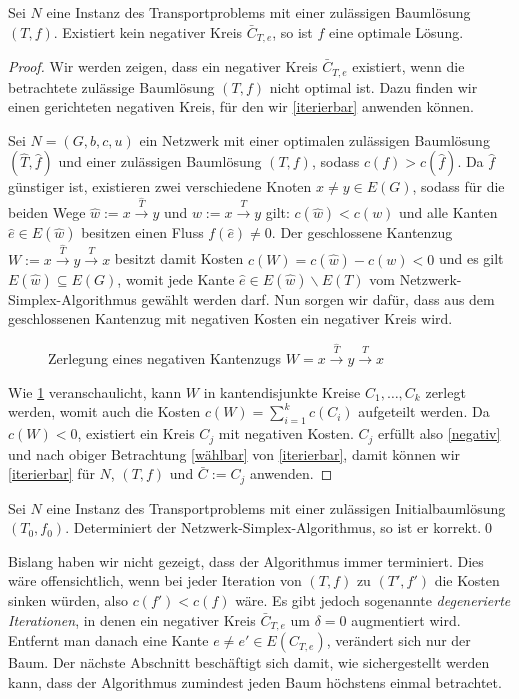 \begin{thm}\label{opt}Sei $N$ eine Instanz des Transportproblems mit einer zulässigen Baumlösung $(T,f)$. Existiert kein negativer Kreis $\bar{C}_{T,e}$, so ist $f$ eine optimale Lösung.\end{thm}
\begin{proof}Wir werden zeigen, dass ein negativer Kreis $\bar{C}_{T,e}$ existiert, wenn die betrachtete zulässige Baumlösung $(T,f)$ nicht optimal ist. Dazu finden wir einen gerichteten negativen Kreis, für den wir \cref{iterierbar} anwenden können.
	
Sei $N=(G,b,c,u)$ ein Netzwerk mit einer optimalen zulässigen Baumlösung $(\hat{T},\hat{f})$ und einer zulässigen Baumlösung $(T,f)$, sodass $c(f)>c(\hat{f})$. Da $\hat{f}$ günstiger ist, existieren zwei verschiedene Knoten $x\neq y\in E(G)$, sodass für die beiden Wege $\hat{w}:=x\xrightarrow{\hat{T}}y$ und $w:=x\xrightarrow{T}y$ gilt: $c(\hat{w})<c(w)$ und alle Kanten $\hat{e}\in E(\hat{w})$ besitzen einen Fluss $f(\hat{e})\neq0$. Der geschlossene Kantenzug $W:=x\xrightarrow{\hat{T}}y\xrightarrow{T}x$ besitzt damit Kosten $c(W)=c(\hat{w})-c(w)<0$ und es gilt $E(\hat{w})\subseteq E(G)$, womit jede Kante $\hat{e}\in E(\hat{w})\backslash E(T)$ vom Netzwerk-Simplex-Algorithmus gewählt werden darf. Nun sorgen wir dafür, dass aus dem geschlossenen Kantenzug mit negativen Kosten ein negativer Kreis wird.

\begin{figure}[!ht]\centering
	
\caption{Zerlegung eines negativen Kantenzugs $W=x\xrightarrow{\hat{T}}y\xrightarrow{T}x$}
\label{fig:decomp}
\end{figure}

Wie \cref{fig:decomp} veranschaulicht, kann $W$ in kantendisjunkte Kreise $C_1,\ldots,C_k$ zerlegt werden, womit auch die Kosten $c(W)=\sum_{i=1}^{k}c(C_i)$ aufgeteilt werden. Da $c(W)<0$, existiert ein Kreis $C_j$ mit negativen Kosten. $C_j$ erfüllt also \cref{negativ} und nach obiger Betrachtung \cref{wählbar} von \cref{iterierbar}, damit können wir \cref{iterierbar} für $N$, $(T,f)$ und $\bar{C}:=C_j$ anwenden.\end{proof}

\begin{kor}\label{korrekt}Sei $N$ eine Instanz des Transportproblems mit einer zulässigen Initialbaumlösung $(T_0,f_0)$. Determiniert der Netzwerk-Simplex-Algorithmus, so ist er korrekt.\qed\end{kor}

Bislang haben wir nicht gezeigt, dass der Algorithmus immer terminiert. Dies wäre offensichtlich, wenn bei jeder Iteration von $(T,f)$ zu $(T',f')$ die Kosten sinken würden, also $c(f')<c(f)$ wäre. Es gibt jedoch sogenannte \emph{degenerierte Iterationen}, in denen ein negativer Kreis $\bar{C}_{T,e}$ um $\delta=0$ augmentiert wird. Entfernt man danach eine Kante $e\neq e'\in E(C_{T,e})$, verändert sich nur der Baum. Der nächste Abschnitt beschäftigt sich damit, wie sichergestellt werden kann, dass der Algorithmus zumindest jeden Baum höchstens einmal betrachtet.


